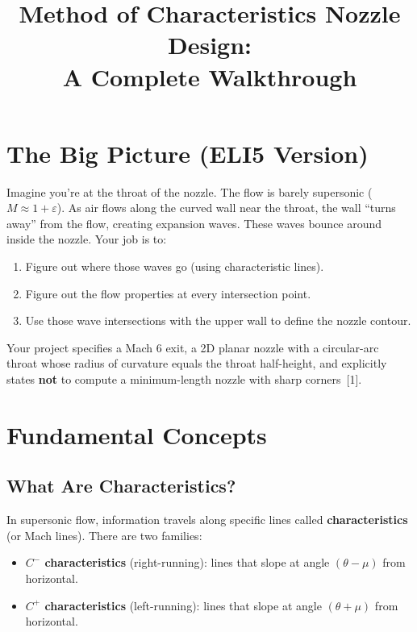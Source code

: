 \documentclass[11pt]{article}
\title{Method of Characteristics Nozzle Design:\\A Complete Walkthrough}
\author{}
\date{}
\begin{document}
\maketitle

\section{The Big Picture (ELI5 Version)}

Imagine you're at the throat of the nozzle. The flow is barely supersonic ($M \approx 1 + \varepsilon$). As air flows along the curved wall near the throat, the wall ``turns away'' from the flow, creating expansion waves. These waves bounce around inside the nozzle. Your job is to:

\begin{enumerate}
    \item Figure out where those waves go (using characteristic lines).
    \item Figure out the flow properties at every intersection point.
    \item Use those wave intersections with the upper wall to define the nozzle contour.
\end{enumerate}

Your project specifies a Mach 6 exit, a 2D planar nozzle with a circular-arc throat whose radius of curvature equals the throat half-height, and explicitly states \textbf{not} to compute a minimum-length nozzle with sharp corners~[1].

\section{Fundamental Concepts}

\subsection{What Are Characteristics?}

In supersonic flow, information travels along specific lines called \textbf{characteristics} (or Mach lines). There are two families:

\begin{itemize}
    \item \textbf{$C^-$ characteristics} (right-running): lines that slope at angle $(\theta - \mu)$ from horizontal.
    \item \textbf{$C^+$ characteristics} (left-running): lines that slope at angle $(\theta + \mu)$ from horizontal.
\end{itemize}
\end{document}
